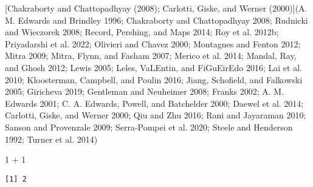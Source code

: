 \documentclass[
  letterpaper,
  DIV=11,
  numbers=noendperiod]{scrartcl}
\newenvironment{Shaded}{\begin{snugshade}}{\end{snugshade}}
\newcommand{\DecValTok}[1]{\textcolor[rgb]{0.68,0.00,0.00}{#1}}
\newcommand{\SpecialCharTok}[1]{\textcolor[rgb]{0.37,0.37,0.37}{#1}}
\begin{document}
{[}Chakraborty and Chattopadhyay (2008); Carlotti, Giske, and Werner
(2000){]}(A. M. Edwards and Brindley 1996; Chakraborty and Chattopadhyay
2008; Rudnicki and Wieczorek 2008; Record, Pershing, and Maps 2014; Roy
et al. 2012b; Priyadarshi et al. 2022; Olivieri and Chavez 2000;
Montagnes and Fenton 2012; Mitra 2009; Mitra, Flynn, and Fasham 2007;
Merico et al. 2014; Mandal, Ray, and Ghosh 2012; Lewis 2005; Leles,
VaLEntin, and FiGuEirEdo 2016; Lai et al. 2010; Kloosterman, Campbell,
and Poulin 2016; Jiang, Schofield, and Falkowski 2005; Giricheva 2019;
Gentleman and Neuheimer 2008; Franks 2002; A. M. Edwards 2001; C. A.
Edwards, Powell, and Batchelder 2000; Daewel et al. 2014; Carlotti,
Giske, and Werner 2000; Qiu and Zhu 2016; Rani and Jayaraman 2010;
Sanson and Provenzale 2009; Serra-Pompei et al. 2020; Steele and
Henderson 1992; Turner et al. 2014)

\begin{Shaded}
\begin{Highlighting}[]
\DecValTok{1} \SpecialCharTok{+} \DecValTok{1}
\end{Highlighting}
\end{Shaded}

\begin{verbatim}
[1] 2
\end{verbatim}
\end{document}
